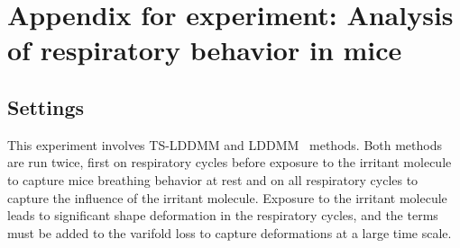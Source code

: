 \begin{table}[hbt!]
  \centering
  \caption{UCR/UEA shape-based time series datasets for classification.}
  \label{appendix:table:datasets}
\end{table}

\section{Appendix for experiment: Analysis of respiratory behavior in mice}
\subsection{Settings}
\label{appendix: mice_exp_setting}

This experiment involves TS-LDDMM and LDDMM~\cite{glaunes2008large} methods. Both methods are run twice, first on respiratory cycles before exposure to the irritant molecule to capture mice breathing behavior at rest and on all respiratory cycles to capture the influence of the irritant molecule. Exposure to the irritant molecule leads to significant shape deformation in the respiratory cycles, and the terms must be added to the varifold loss to capture deformations at a large time scale. 

